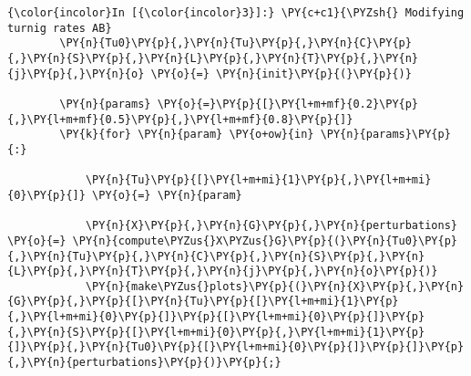     \begin{Verbatim}[commandchars=\\\{\}]
{\color{incolor}In [{\color{incolor}3}]:} \PY{c+c1}{\PYZsh{} Modifying turnig rates AB}
        \PY{n}{Tu0}\PY{p}{,}\PY{n}{Tu}\PY{p}{,}\PY{n}{C}\PY{p}{,}\PY{n}{S}\PY{p}{,}\PY{n}{L}\PY{p}{,}\PY{n}{T}\PY{p}{,}\PY{n}{j}\PY{p}{,}\PY{n}{o} \PY{o}{=} \PY{n}{init}\PY{p}{(}\PY{p}{)}
        
        \PY{n}{params} \PY{o}{=}\PY{p}{[}\PY{l+m+mf}{0.2}\PY{p}{,}\PY{l+m+mf}{0.5}\PY{p}{,}\PY{l+m+mf}{0.8}\PY{p}{]}
        \PY{k}{for} \PY{n}{param} \PY{o+ow}{in} \PY{n}{params}\PY{p}{:}
            
            \PY{n}{Tu}\PY{p}{[}\PY{l+m+mi}{1}\PY{p}{,}\PY{l+m+mi}{0}\PY{p}{]} \PY{o}{=} \PY{n}{param}
        
            \PY{n}{X}\PY{p}{,}\PY{n}{G}\PY{p}{,}\PY{n}{perturbations} \PY{o}{=} \PY{n}{compute\PYZus{}X\PYZus{}G}\PY{p}{(}\PY{n}{Tu0}\PY{p}{,}\PY{n}{Tu}\PY{p}{,}\PY{n}{C}\PY{p}{,}\PY{n}{S}\PY{p}{,}\PY{n}{L}\PY{p}{,}\PY{n}{T}\PY{p}{,}\PY{n}{j}\PY{p}{,}\PY{n}{o}\PY{p}{)}
            \PY{n}{make\PYZus{}plots}\PY{p}{(}\PY{n}{X}\PY{p}{,}\PY{n}{G}\PY{p}{,}\PY{p}{[}\PY{n}{Tu}\PY{p}{[}\PY{l+m+mi}{1}\PY{p}{,}\PY{l+m+mi}{0}\PY{p}{]}\PY{p}{[}\PY{l+m+mi}{0}\PY{p}{]}\PY{p}{,}\PY{n}{S}\PY{p}{[}\PY{l+m+mi}{0}\PY{p}{,}\PY{l+m+mi}{1}\PY{p}{]}\PY{p}{,}\PY{n}{Tu0}\PY{p}{[}\PY{l+m+mi}{0}\PY{p}{]}\PY{p}{]}\PY{p}{,}\PY{n}{perturbations}\PY{p}{)}\PY{p}{;}
\end{Verbatim}


    \begin{center}
    \end{center}
    { \hspace*{\fill} \\}
    
    \begin{center}
    \end{center}
    { \hspace*{\fill} \\}
    
    \begin{center}
    \end{center}
    { \hspace*{\fill} \\}
    
